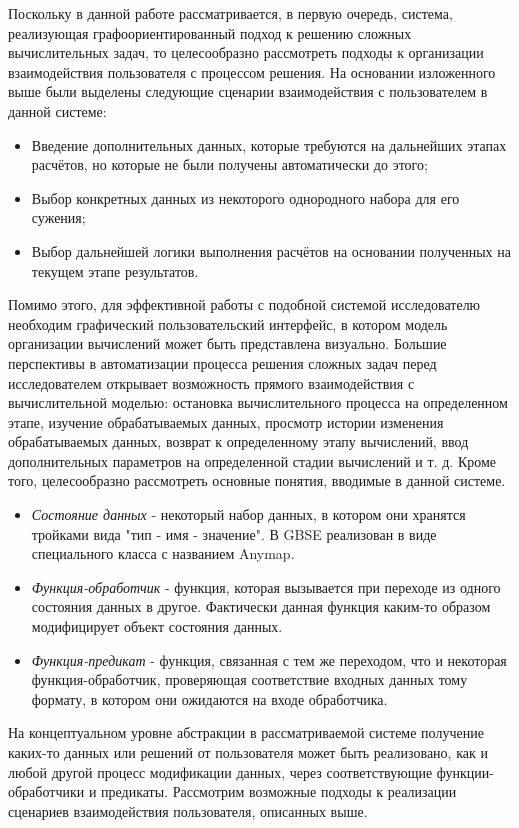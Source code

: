 Поскольку в данной работе рассматривается, в первую очередь, система, реализующая графоориентированный подход к решению сложных вычислительных задач, то целесообразно рассмотреть подходы к организации взаимодействия пользователя с процессом решения. На основании изложенного выше были выделены следующие сценарии взаимодействия с пользователем в данной системе:
\begin{itemize}
    \item Введение дополнительных данных, которые требуются на дальнейших этапах расчётов, но которые не были получены автоматически до этого;
    \item Выбор конкретных данных из некоторого однородного набора для его сужения;
    \item Выбор дальнейшей логики выполнения расчётов на основании полученных на текущем этапе результатов.
\end{itemize}
Помимо этого, для эффективной работы с подобной системой исследователю необходим графический пользовательский интерфейс, в котором модель организации вычислений может быть представлена визуально. Большие перспективы в автоматизации процесса решения сложных задач перед исследователем открывает возможность прямого взаимодействия с вычислительной моделью: остановка вычислительного процесса на определенном этапе, изучение обрабатываемых данных, просмотр истории изменения обрабатываемых данных, возврат к определенному этапу вычислений, ввод
дополнительных параметров на определенной
стадии вычислений и т. д.\cite{SokolovCADCMInteraction2021}
Кроме того, целесообразно рассмотреть основные понятия, вводимые в данной системе.
\begin{itemize}
    \item \emph{Состояние данных} - некоторый набор данных, в котором они хранятся тройками вида "тип - имя - значение". В GBSE реализован в виде специального класса с названием \textsf{Anymap}.
    \item \emph{Функция-обработчик} - функция, которая вызывается при переходе из одного состояния данных в другое. Фактически данная функция каким-то образом модифицирует объект состояния данных.
    \item \emph{Функция-предикат} - функция, связанная с тем же переходом, что и некоторая функция-обработчик, проверяющая соответствие входных данных тому формату, в котором они ожидаются на входе обработчика.
\end{itemize}
На концептуальном уровне абстракции в рассматриваемой системе получение каких-то данных или решений от пользователя может быть реализовано, как и любой другой процесс модификации данных, через соответствующие функции-обработчики и предикаты. Рассмотрим возможные подходы к реализации сценариев взаимодействия пользователя, описанных выше.

